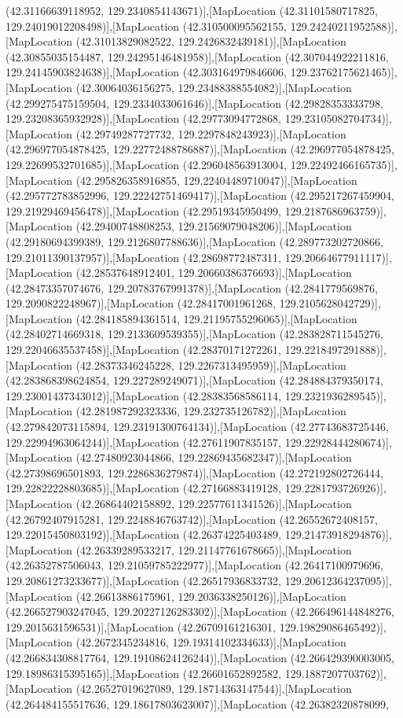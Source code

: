 (42.31166639118952, 129.2340854143671)],[MapLocation (42.31101580717825, 129.24019012208498)],[MapLocation (42.310500095562155, 129.24240211952588)],[MapLocation (42.31013829082522, 129.2426832439181)],[MapLocation (42.30855035154487, 129.24295146481958)],[MapLocation (42.307044922211816, 129.24145903824638)],[MapLocation (42.303164979846606, 129.23762175621465)],[MapLocation (42.30064036156275, 129.23488388554082)],[MapLocation (42.299275475159504, 129.2334033061646)],[MapLocation (42.29828353333798, 129.23208365932928)],[MapLocation (42.29773094772868, 129.23105082704734)],[MapLocation (42.29749287727732, 129.2297848243923)],[MapLocation (42.296977054878425, 129.22772488786887)],[MapLocation (42.296977054878425, 129.22699532701685)],[MapLocation (42.296048563913004, 129.22492466165735)],[MapLocation (42.295826358916855, 129.22404489710047)],[MapLocation (42.295772783852996, 129.22242751469417)],[MapLocation (42.295217267459904, 129.21929469456478)],[MapLocation (42.29519345950499, 129.2187686963759)],[MapLocation (42.29400748808253, 129.21569079048206)],[MapLocation (42.29180694399389, 129.2126807788636)],[MapLocation (42.289773202720866, 129.21011390137957)],[MapLocation (42.28698772487311, 129.20664677911117)],[MapLocation (42.28537648912401, 129.20660386376693)],[MapLocation (42.28473357074676, 129.20783767991378)],[MapLocation (42.2841779569876, 129.2090822248967)],[MapLocation (42.28417001961268, 129.2105628042729)],[MapLocation (42.284185894361514, 129.21195755296065)],[MapLocation (42.28402714669318, 129.2133609539355)],[MapLocation (42.283828711545276, 129.22046635537458)],[MapLocation (42.28370171272261, 129.2218497291888)],[MapLocation (42.28373346245228, 129.2267313495959)],[MapLocation (42.283868398624854, 129.227289249071)],[MapLocation (42.284884379350174, 129.23001437343012)],[MapLocation (42.28383568586114, 129.2321936289545)],[MapLocation (42.281987292323336, 129.232735126782)],[MapLocation (42.279842073115894, 129.23191300764134)],[MapLocation (42.27743683725446, 129.22994963064244)],[MapLocation (42.27611907835157, 129.22928444280674)],[MapLocation (42.27480923044866, 129.22869435682347)],[MapLocation (42.27398696501893, 129.2286836279874)],[MapLocation (42.272192802726444, 129.22822228803685)],[MapLocation (42.27166883419128, 129.2281793726926)],[MapLocation (42.26864402158892, 129.22577611341526)],[MapLocation (42.26792407915281, 129.2248846763742)],[MapLocation (42.26552672408157, 129.22015450803192)],[MapLocation (42.26374225403489, 129.21473918294876)],[MapLocation (42.26339289533217, 129.21147761678665)],[MapLocation (42.26352787506043, 129.21059785222977)],[MapLocation (42.26417100979696, 129.20861273233677)],[MapLocation (42.26517936833732, 129.20612364237095)],[MapLocation (42.26613886175961, 129.2036338250126)],[MapLocation (42.266527903247045, 129.20227126283302)],[MapLocation (42.266496144848276, 129.2015631596531)],[MapLocation (42.26709161216301, 129.19829086465492)],[MapLocation (42.2672345234816, 129.19314102334633)],[MapLocation (42.266834308817764, 129.19108624126244)],[MapLocation (42.266429390003005, 129.18986315395165)],[MapLocation (42.26601652892582, 129.1887207703762)],[MapLocation (42.26527019627089, 129.18714363147544)],[MapLocation (42.264484155517636, 129.18617803623007)],[MapLocation (42.26382320878099, 